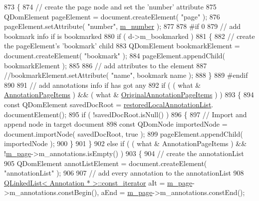 \begin{DoxyCode}
873 \{
874     \textcolor{comment}{// create the page node and set the 'number' attribute}
875     QDomElement pageElement = document.createElement( \textcolor{stringliteral}{"page"} );
876     pageElement.setAttribute( \textcolor{stringliteral}{"number"}, \hyperlink{classOkular_1_1PagePrivate_a449baffebfd4db332b181cb2e644ab5e}{m\_number} );
877 
878 \textcolor{preprocessor}{#if 0}
879     \textcolor{comment}{// add bookmark info if is bookmarked}
880     \textcolor{keywordflow}{if} ( d->m\_bookmarked )
881     \{
882         \textcolor{comment}{// create the pageElement's 'bookmark' child}
883         QDomElement bookmarkElement = document.createElement( \textcolor{stringliteral}{"bookmark"} );
884         pageElement.appendChild( bookmarkElement );
885 
886         \textcolor{comment}{// add attributes to the element}
887         \textcolor{comment}{//bookmarkElement.setAttribute( "name", bookmark name );}
888     \}
889 \textcolor{preprocessor}{#endif}
890 
891     \textcolor{comment}{// add annotations info if has got any}
892     \textcolor{keywordflow}{if} ( ( what & \hyperlink{namespaceOkular_ad8955fd515cc3f63a14cdff6723e6c1bae381057ad4a79c350a0d4a9aaaaa995b}{AnnotationPageItems} ) && ( what & 
      \hyperlink{namespaceOkular_ad8955fd515cc3f63a14cdff6723e6c1ba1feb4fde97e57698f97d64a2a3b824bb}{OriginalAnnotationPageItems} ) )
893     \{
894         \textcolor{keyword}{const} QDomElement savedDocRoot = \hyperlink{classOkular_1_1PagePrivate_ac81ba5bf127f946b7b810821081c9f42}{restoredLocalAnnotationList}.
      documentElement();
895         \textcolor{keywordflow}{if} ( !savedDocRoot.isNull() )
896         \{
897             \textcolor{comment}{// Import and append node in target document}
898             \textcolor{keyword}{const} QDomNode importedNode = document.importNode( savedDocRoot, \textcolor{keyword}{true} );
899             pageElement.appendChild( importedNode );
900         \}
901     \}
902     \textcolor{keywordflow}{else} \textcolor{keywordflow}{if} ( ( what & AnnotationPageItems ) && !\hyperlink{classOkular_1_1PagePrivate_a07c3e158a239c990c2ddcac53a6dd3c6}{m\_page}->m\_annotations.isEmpty() )
903     \{
904         \textcolor{comment}{// create the annotationList}
905         QDomElement annotListElement = document.createElement( \textcolor{stringliteral}{"annotationList"} );
906 
907         \textcolor{comment}{// add every annotation to the annotationList}
908         \hyperlink{classQLinkedList}{QLinkedList< Annotation * >::const\_iterator} aIt = 
      \hyperlink{classOkular_1_1PagePrivate_a07c3e158a239c990c2ddcac53a6dd3c6}{m\_page}->m\_annotations.constBegin(), aEnd = \hyperlink{classOkular_1_1PagePrivate_a07c3e158a239c990c2ddcac53a6dd3c6}{m\_page}->m\_annotations.constEnd();

\end{DoxyCode}
